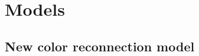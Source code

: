 \documentclass[ALICE,manyauthors]{StrinJet}
\begin{document}



\section{Models}
\label{sec:model}
\subsection{New color reconnection model}
\label{subsec:cr}
\end{document}
